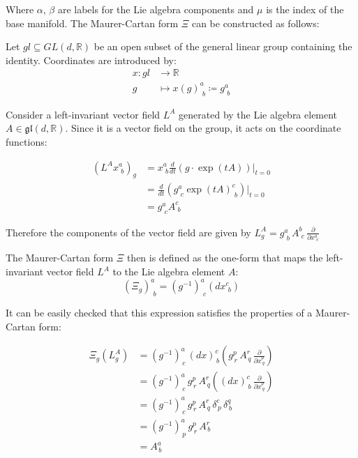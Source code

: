 Where $\alpha, \,  \beta$ are labels for the Lie algebra components and $\mu$ is the index of the base manifold. 
The Maurer-Cartan form \( \Xi \) can be constructed as follows:

Let \( gl \subseteq GL(d,\mathbb{R}) \) be an open subset of the general linear group containing the identity. Coordinates are introduced by:
\begin{align*}
  x: gl &\longrightarrow \mathbb{R} \\
  g &\mapsto x(g)^a_{\,\,b} \coloneq g^a_{\,\,b}
\end{align*}

Consider a left-invariant vector field \( L^A \) generated by the Lie algebra element \( A \in \mathfrak{gl}(d, \mathbb{R}) \). Since it is a vector field on the group, it acts on the coordinate functions:

\begin{align*}
  \left( L^A x^a_{\,\,b} \right)_g &= x^a_{\,\,b} \frac{d}{dt} \left( g \cdot \exp(tA) \right) \bigg|_{t=0} \\
  &= \frac{d}{dt} \left( g^a_{\,\,c} \exp(tA)^c_{\,\,b} \right) \bigg|_{t=0} \\
  &= g^a_{\,\,c} A^c_{\,\,b}
\end{align*}


Therefore the components of the vector field are given by \( L^A_g = g^a_{\,\,b} \, A^b_{\,\,c} \, \frac{\partial}{\partial x^a_{\,\,c}} \) \cite{FredericSchullerLocalrepresentationsconnectionbasemanifoldYangMillsfieldsLec222015}

The Maurer-Cartan form $\Xi$ then is defined as the one-form that maps the left-invariant vector field \( L^A \) to the Lie algebra element \( A \):
\[ (\Xi_g)^a_{\,\,b} = (g^{-1})^a_{\,\,c}(dx^c_{\,\,b}) \]

It can be easily checked that this expression satisfies the properties of a Maurer-Cartan form:

\begin{align*}
  \Xi_g(L^A_g) 
  &= (g^{-1})^a_{\,c} \, (dx)^c_{\,b} \left( g^p_{\,r} \, A^r_{\,q} \, \frac{\partial}{\partial x^p_{\,q}} \right) \\
  &= (g^{-1})^a_{\,c} \, g^p_{\,r} \, A^r_{\,q} \left( (dx)^c_{\,b} \, \frac{\partial}{\partial x^p_{\,q}} \right) \\
  &= (g^{-1})^a_{\,c} \, g^p_{\,r} \, A^r_{\,q} \, \delta^c_{\,p} \, \delta^q_{\,b} \\
  &= (g^{-1})^a_{\,p} \, g^p_{\,r} \, A^r_{\,b} \\
  &= A^a_{\,b}
\end{align*}


